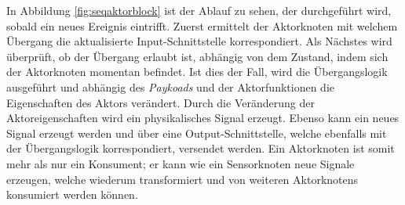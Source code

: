 In Abbildung \ref{fig:seqaktorblock} ist der Ablauf zu sehen, der durchgeführt wird, sobald ein neues Ereignis eintrifft. Zuerst ermittelt der Aktorknoten mit welchem Übergang die aktualisierte Input-Schnittstelle korrespondiert. Als Nächstes wird überprüft, ob der Übergang erlaubt ist, abhängig von dem Zustand, indem sich der Aktorknoten momentan befindet. Ist dies der Fall, wird die Übergangslogik ausgeführt und abhängig des \textit{Paykoads} und der Aktorfunktionen die Eigenschaften des Aktors verändert. Durch die Veränderung der Aktoreigenschaften wird ein physikalisches Signal erzeugt. Ebenso kann ein neues Signal erzeugt werden und über eine Output-Schnittstelle, welche ebenfalls mit der Übergangslogik korrespondiert, versendet werden. Ein Aktorknoten ist somit mehr als nur ein Konsument; er kann wie ein Sensorknoten neue Signale erzeugen, welche wiederum transformiert und von weiteren Aktorknotens konsumiert werden können.

